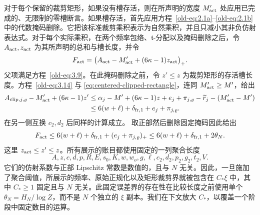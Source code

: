 \documentclass[11pt,a4paper]{article}
\numberwithin{equation}{section}
\numberwithin{figure}{section}
\theoremstyle{definition}
\theoremstyle{remark}
\begin{document}
对于每个保留的裁剪矩形，如果没有槽存活，则在所声明的宽度 \(M'_{\rm act}\) 处应用已完成的、无限制的零槽断言。如果槽存活，首先应用方程~\eqref{old-eq:2.1a}--\eqref{old-eq:2.1b} 中的代数掩码删除。它把该标准裁剪乘积表示为自然乘积，并且只减小其非负仿射表达式。对于每个实际乘积，在两个频率包络、\(\mathfrak t\)-分配以及掩码删除之后，令 \(A_{\rm act},z_{\rm act}\) 为其所声明的总和与槽长度，并令
\[
 F_{\rm act}
 =\bigl(A_{\rm act}-M'_{\rm act}+(6\kappa-1)z_{\rm act}\bigr)_+.
\]
父项满足方程~\eqref{old-eq:3.9}。在此掩码删除之前，令 \(z'\le z\) 为裁剪矩形的存活槽长度。方程~\eqref{old-eq:3.14} 与 \eqref{eq:centered-clipped-rectangle}，连同 \(M'_{\rm act}\ge M'\)，给出
\[
 \begin{split}
 A_{{\rm clip},j,\varrho}-M'_{\rm act}+(6\kappa-1)z'
 &\le \alpha_j-M'+(6\kappa-1)z
       +e_j+\pi_{j,\varrho}-\widetilde r_j-(M'_{\rm act}-M')\\
 &\le6(w+\ell)+\delta_{{\rm fr},1}+e_j+\pi_{j,\varrho}.
 \end{split}
\]
在另一侧互换 \(c_2,d_2\) 后同样的计算成立。
取正部然后删除固定掩码因此给出
\[
 F_{\rm act}\le6(w+\ell)+\delta_{{\rm fr},1}
                 +(e_j+\pi_{j,\varrho})_+
 \le6(w+\ell)+\delta_{{\rm fr},1}+2\theta_N.
\]
这里 \(z_{\rm act}\le z'\le z\)。所有展示的账目都使用固定的一列聚合长度
\[
 A,z,c,d,p,R,E,s_0,K,w,w_o,g,\ell,c_2,d_2,p_2,g_2,t_2,V.
\]
它们的仿射系数与正部 Lipschitz 常数是数值的，且与 \(N\) 无关。因此，一旦施加了聚合阈值，所展示的频率、原始正规化以及矩形裁剪界就被包含在 \(C_*\xi\) 中，其中 \(C_*\ge1\) 固定且与 \(N\) 无关。此固定误差界的存在性在比较长度之前使用单个 \(\theta_N=H_N/\log Z\)，而不是 \(N\) 个独立的 \(\xi\) 副本。我们在下文放大 \(C_*\)，以覆盖一个阶段中固定数目的运算。
\end{document}

